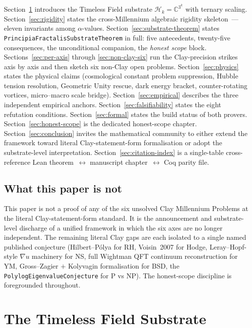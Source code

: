 \documentclass[11pt,a4paper]{article}
\theoremstyle{definition}
\theoremstyle{remark}
\newcommand{\complexes}{\mathbb{C}}
\newcommand{\HilbertK}{\mathcal{H}_{k}}
\newcommand{\lean}[1]{\texttt{\small #1}}
\begin{document}
Section~\ref{sec:substrate} introduces the Timeless Field
substrate $\HilbertK = \complexes^{3^{k}}$ with ternary scaling.
Section~\ref{sec:rigidity} states the cross-Millennium algebraic
rigidity skeleton~--- eleven invariants among $\alpha$-values.
Section~\ref{sec:substrate-theorem} states
\lean{PrincipiaFractalisSubstrateTheorem} in full: five antecedents,
twenty-five consequences, the unconditional companion, the
\emph{honest scope} block. Sections~\ref{sec:per-axis} through
\ref{sec:non-clay-six} run the Clay-precision strikes axis by axis
and then sketch six non-Clay open problems. Section~\ref{sec:physics}
states the physical claims (cosmological constant problem
suppression, Hubble tension resolution, Geometric Unity rescue,
dark energy bracket, counter-rotating vortices,
micro--macro scale bridge). Section~\ref{sec:empirical} describes
the three independent empirical anchors. Section~\ref{sec:falsifiability}
states the eight refutation conditions. Section~\ref{sec:formal}
states the build status of both provers. Section~\ref{sec:honest-scope}
is the dedicated honest-scope chapter. Section~\ref{sec:conclusion}
invites the mathematical community to either extend the framework
toward literal Clay-statement-form formalisation or adopt the
substrate-level interpretation. Section~\ref{sec:citation-index}
is a single-table cross-reference Lean theorem~$\leftrightarrow$
manuscript chapter~$\leftrightarrow$ Coq parity file.

\subsection{What this paper is not}

This paper is not a proof of any of the six unsolved Clay
Millennium Problems at the literal Clay-statement-form standard.
It is the announcement and substrate-level discharge of a unified
framework in which the six axes are no longer independent. The
remaining literal Clay gaps are each isolated to a single named
published conjecture (Hilbert--P\'olya for RH, Voisin~2007 for
Hodge, Leray--Hopf-style $\nabla u$ machinery for NS, full
Wightman QFT continuum reconstruction for YM, Gross--Zagier
$+$ Kolyvagin formalisation for BSD, the
\lean{PolylogEigenvalueConjecture} for P vs NP). The honest-scope
discipline is foregrounded throughout.

\section{The Timeless Field Substrate}
\label{sec:substrate}
\end{document}
